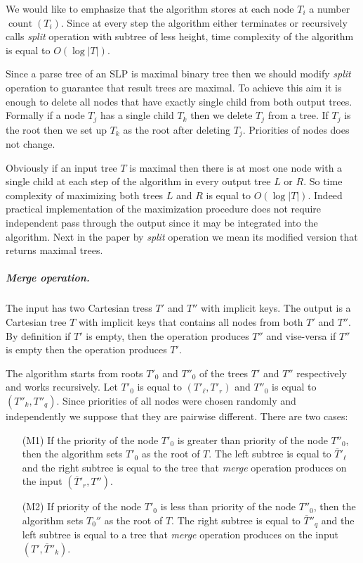 ﻿\documentclass[11pt]{article}
\theoremstyle{remark}
\DeclareMathOperator{\cnt}{count} \DeclareMathOperator{\splt}{\emph{split}}
\begin{document}
We would like to emphasize that the algorithm stores at each node $T_i$ a number $\cnt(T_i)$. Since at every step the
algorithm either terminates or recursively calls \emph{split} operation with subtree of less height, time complexity 
of the algorithm is equal to $O(\log|T|)$.

Since a parse tree of an SLP is maximal binary tree then we should modify \emph{split} operation to guarantee that result
trees are maximal. To achieve this aim it is enough to delete all nodes that have exactly single child from both output trees. 
Formally if a node $T_j$ has a single child $T_k$ then we delete $T_j$ from a tree.
If $T_j$ is the root then we set up $T_k$ as the root after deleting $T_j$. Priorities of nodes does not change. 

Obviously if an input tree $T$ is maximal then there is at most one node with a single child at each step of the algorithm
in every output tree $L$ or $R$. So time complexity of maximizing both trees $L$ and $R$ is equal to $O(\log|T|)$.
Indeed practical implementation of the maximization procedure does not require independent pass through the output since it may be
integrated into the algorithm. Next in the paper by \emph{split} operation we mean its modified version that returns
maximal trees.

\subparagraph*{\emph{Merge} operation.} The input has two Cartesian tress $T'$ and $T''$ with implicit keys. 
The output is a Cartesian tree $T$ with implicit keys that contains all nodes from both
$T'$ and $T''$. By definition if $T'$ is empty, then the operation produces $T''$ and vise-versa if $T''$ is empty then
the operation produces $T'$.

The algorithm starts from roots $T'_0$ and $T''_0$ of the trees $T'$ and $T''$ respectively and works recursively. 
Let $T'_0$ is equal to $(T'_{\ell}, T'_{r})$ and $T''_0$ is equal to $(T''_{k}, T''_{q})$. Since priorities of all nodes 
were chosen randomly and independently we suppose that they are pairwise different. There are two cases:

\begin{itemize}
  \item[(M1)] If the priority of the node $T'_0$ is greater than priority of the node $T''_0$, then the algorithm sets $T'_0$ as the
  root of $T$. The left subtree is equal to $\overline{T}'_{\ell}$ and the right subtree is equal to the tree that
  \emph{merge} operation produces on the input $(\overline{T}'_{r},T'')$.
  \item[(M2)] If priority of the node $T'_0$ is less than priority of the node $T''_0$, then the algorithm sets $T_0''$ as the root
  of $T$. The right subtree is equal to $\overline{T}''_{q}$ and the left subtree is equal to a tree that \emph{merge} operation 
  produces on the input $(T',\overline{T}''_k)$.
\end{itemize}
\end{document}
